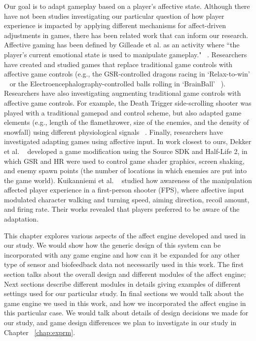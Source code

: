 
Our goal is to adapt gameplay based on a player's affective state. Although there have not been studies investigating our particular question of how player experience is impacted by applying different mechanisms for affect-driven adjustments in games, there has been related work that can inform our research. Affective gaming has been defined by Gilleade et al. as an activity where ``the player's current emotional state is used to manipulate gameplay." ~\cite{gilleade2005affective}. Researchers have created and studied games that replace traditional game controls with affective game controls (e.g., the GSR-controlled dragons racing in `Relax-to-win' ~\cite{bersak2001intelligent} or the Electroencephalography-controlled balls rolling in `BrainBall' ~\cite{hjelm2003research}). Researchers have also investigating augmenting traditional game controls with affective game controls. For example, the Death Trigger side-scrolling shooter was played with a traditional gamepad and control scheme, but also adapted game elements (e.g., length of the flamethrower, size of the enemies, and the density of snowfall) using different physiological signals ~\cite{nacke2011biofeedback}. Finally, researchers have investigated adapting games using affective input. In work closest to ours, Dekker et al. ~\cite{dekker2007please} developed a game modification using the Source SDK and Half-Life 2, in which GSR and HR were used to control game shader graphics, screen shaking, and enemy spawn points (the number of locations in which enemies are put into the game world).  Kuikanniemi et al. ~\cite{kuikkaniemi2010influence} studied how awareness of the manipulation affected player experience in a first-person shooter (FPS), where affective input modulated character walking and turning speed, aiming direction, recoil amount, and firing rate. Their works revealed that players preferred to be aware of the adaptation.

This chapter explores various aspects of the affect engine developed and used in our study. We would show how the generic design of this system can be incorporated with any game engine and how can it be expanded for any other type of sensor and biofeedback data not necessarily used in this work. The first section talks about the overall design and different modules of the affect engine; Next sections describe different modules in details giving examples of different settings used for our particular study. In final sections we would talk about the game engine we used in this work, and how we incorporated the affect engine in this particular case. We would talk about details of design decisions we made for our study, and game design differences we plan to investigate in our study in Chapter ~\ref{chap:exprm}.

